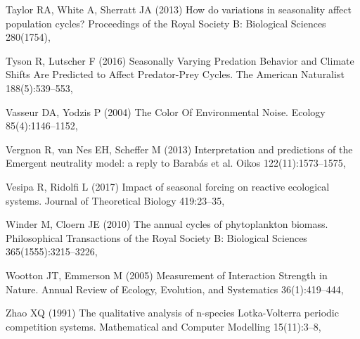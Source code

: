 \documentclass[smallcondensed,referee]{svjour3}       %
\begin{document}
\begin{thebibliography}{56}
Taylor RA, White A, Sherratt JA (2013) How do variations in seasonality affect
  population cycles? Proceedings of the Royal Society B: Biological Sciences
  280(1754), 

Tyson R, Lutscher F (2016) Seasonally {Varying} {Predation} {Behavior} and
  {Climate} {Shifts} {Are} {Predicted} to {Affect} {Predator}-{Prey} {Cycles}.
  The American Naturalist 188(5):539--553, 

Vasseur DA, Yodzis P (2004) {T}he {C}olor {O}f {E}nvironmental {N}oise. Ecology
  85(4):1146--1152, 

Vergnon R, van Nes EH, Scheffer M (2013) Interpretation and predictions of the
  {Emergent} neutrality model: a reply to {Barab\'as} et al. Oikos
  122(11):1573--1575, 

Vesipa R, Ridolfi L (2017) Impact of seasonal forcing on reactive ecological
  systems. Journal of Theoretical Biology 419:23--35,

Winder M, Cloern JE (2010) The annual cycles of phytoplankton biomass.
  Philosophical Transactions of the Royal Society B: Biological Sciences
  365(1555):3215--3226, 

Wootton JT, Emmerson M (2005) Measurement of {Interaction} {Strength} in
  {Nature}. Annual Review of Ecology, Evolution, and Systematics
  36(1):419--444, 

Zhao XQ (1991) The qualitative analysis of n-species {L}otka-{V}olterra
  periodic competition systems. Mathematical and Computer Modelling
  15(11):3--8, 

\end{thebibliography}
\end{document}
